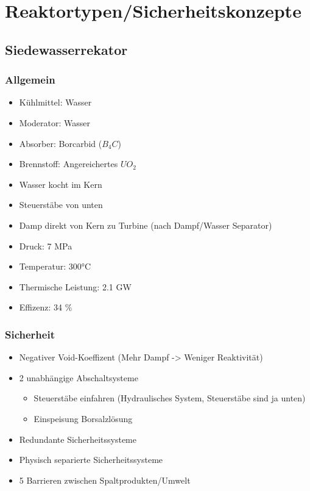 \documentclass[12pt]{article}
\begin{document}
\thispagestyle{empty}

\section{Reaktortypen/Sicherheitskonzepte}

\subsection{Siedewasserrekator}

\subsubsection{Allgemein}
\begin{itemize}
  \item Kühlmittel: Wasser
  \item Moderator: Wasser
  \item Absorber: Borcarbid (\(B_4C\))
  \item Brennstoff: Angereichertes \(UO_2\)
  \item Wasser kocht im Kern
  \item Steuerstäbe von unten
  \item Damp direkt von Kern zu Turbine (nach Dampf/Wasser Separator)
  \item Druck: 7 MPa
  \item Temperatur: 300°C
  \item Thermische Leistung: 2.1 GW
  \item Effizenz: 34 \%
\end{itemize}

\subsubsection{Sicherheit}
\begin{itemize}
  \item Negativer Void-Koeffizent (Mehr Dampf -> Weniger Reaktivität)
  \item 2 unabhängige Abschaltsysteme
  \begin{itemize}
    \item Steuerstäbe einfahren (Hydraulisches System, Steuerstäbe sind ja unten)
    \item Einspeisung Borsalzlösung
  \end{itemize}
  \item Redundante Sicherheitssysteme
  \item Physisch separierte Sicherheitssysteme
  \item 5 Barrieren zwischen Spaltprodukten/Umwelt
\end{itemize}
\end{document}
